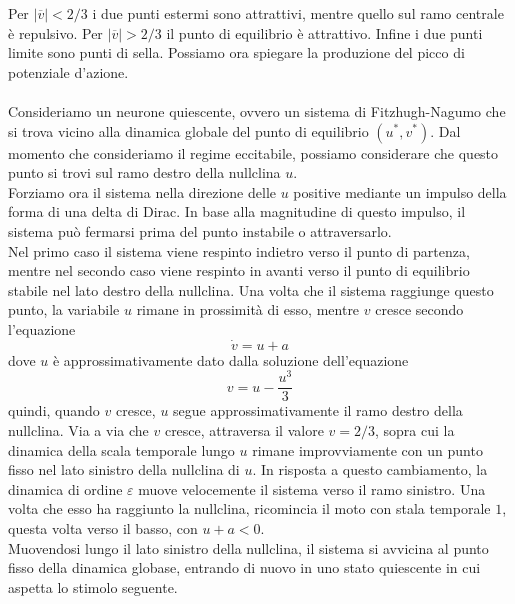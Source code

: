 \documentclass[12pt]{article}
\begin{document}
Per $|\overline{v}|<2/3$ i due punti estermi sono attrattivi, mentre quello sul ramo centrale è repulsivo. Per $|\overline{v}|>2/3$ il punto di equilibrio è attrattivo. Infine i due punti limite sono punti di sella. Possiamo ora spiegare la produzione del picco di potenziale d'azione. \\ \\
Consideriamo un neurone quiescente, ovvero un sistema di Fitzhugh-Nagumo che si trova vicino alla dinamica globale del punto di equilibrio $(u^*,v^*)$. Dal momento che consideriamo il regime eccitabile, possiamo considerare che questo punto si trovi sul ramo destro della nullclina $u$. \\
Forziamo ora il sistema nella direzione delle $u$ positive mediante un impulso della forma di una delta di Dirac. In base alla magnitudine di questo impulso, il sistema può fermarsi prima del punto instabile o attraversarlo. \\
Nel primo caso il sistema viene respinto indietro verso il punto di partenza, mentre nel secondo caso viene respinto in avanti verso il punto di equilibrio stabile nel lato destro della nullclina. Una volta che il sistema raggiunge questo punto, la variabile $u$ rimane in prossimità di esso, mentre $v$ cresce secondo l'equazione
$$
\dot{v} = u + a
$$ 
dove $u$ è approssimativamente dato dalla soluzione dell'equazione
$$
v = u - \frac{u^3}{3}
$$
quindi, quando $v$ cresce, $u$ segue approssimativamente il ramo destro della nullclina. Via a via che $v$ cresce, attraversa il valore $v = 2/3$, sopra cui la dinamica della scala temporale lungo $u$ rimane improvviamente con un punto fisso nel lato sinistro della nullclina di $u$. In risposta a questo cambiamento, la dinamica di ordine $\varepsilon$ muove velocemente il sistema verso il ramo sinistro. Una volta che esso ha raggiunto la nullclina, ricomincia il moto con stala temporale $1$, questa volta verso il basso, con $u + a < 0$. \\
Muovendosi lungo il lato sinistro della nullclina, il sistema si avvicina al punto fisso della dinamica globase, entrando di nuovo in uno stato quiescente in cui aspetta lo stimolo seguente.
\end{document}
